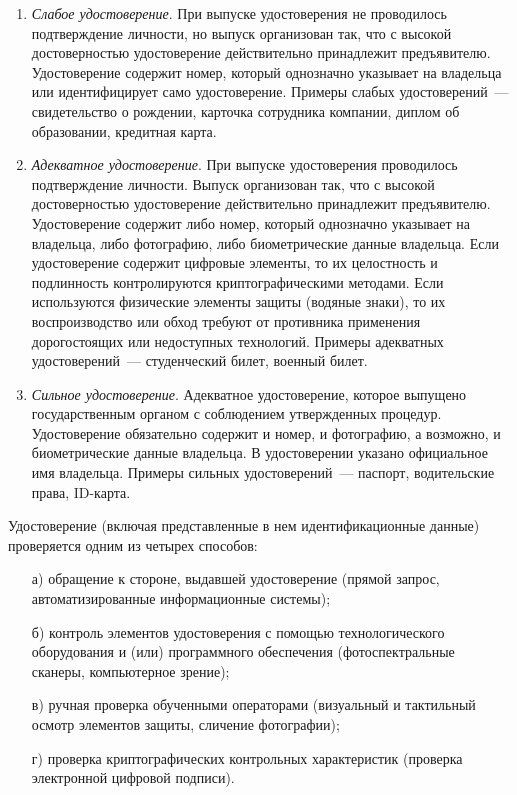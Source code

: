 \begin{enumerate}
\item
{\it Слабое удостоверение}. 
При выпуске удостоверения не проводилось подтверждение личности, но выпуск
организован так, что с высокой достоверностью удостоверение действительно
принадлежит предъявителю. Удостоверение содержит номер, который однозначно
указывает на владельца или идентифицирует само удостоверение.
%
Примеры слабых удостоверений~--- свидетельство о рождении, карточка сотрудника 
компании, диплом об образовании, кредитная карта.


\item
{\it Адекватное удостоверение}. 
При выпуске удостоверения проводилось подтверждение личности.
Выпуск организован так, что с высокой достоверностью
удостоверение действительно принадлежит предъявителю. 
%
Удостоверение содержит либо номер, который однозначно указывает на 
владельца, либо фотографию, либо биометрические данные владельца.
% 
Если удостоверение содержит цифровые элементы, то их целостность и 
подлинность контролируются криптографическими методами. 
%
Если используются физические элементы защиты (водяные знаки),  
то их воспроизводство или обход требуют от противника применения 
дорогостоящих или недоступных технологий. 
%
Примеры адекватных удостоверений~--- студенческий билет, военный билет.

\item
{\it Сильное удостоверение}. 
Адекватное удостоверение, которое выпущено государственным органом с 
соблюдением утвержденных процедур. Удостоверение обязательно содержит 
и номер, и фотографию, а возможно, и биометрические данные владельца.
В удостоверении указано официальное имя владельца.
%
Примеры сильных удостоверений~--- паспорт, водительские права, ID-карта.
\end{enumerate}

Удостоверение (включая представленные в нем идентификационные данные) 
проверяется одним из четырех способов:
\begin{enumerate}
\item[а)]
обращение к стороне, выдавшей удостоверение (прямой запрос, 
автоматизированные информационные системы);
%
%
\item[б)]
контроль элементов удостоверения с помощью технологического оборудования 
и (или) программного обеспечения (фотоспектральные сканеры, компьютерное 
зрение);
%
%
\item[в)]
ручная проверка обученными операторами (визуальный и тактильный осмотр 
элементов защиты, сличение фотографии);
%

\item[г)]
проверка криптографических контрольных характеристик
(проверка электронной цифровой подписи).
%
%
\end{enumerate}

